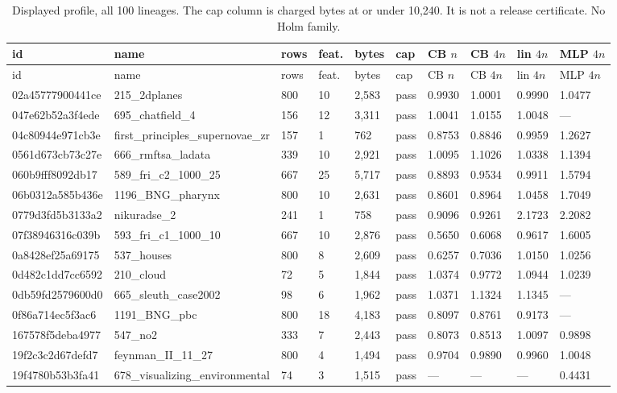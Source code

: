\scriptsize
\begin{longtable}{llllllllll}
\caption{Displayed profile, all 100 lineages. The cap column is charged bytes at or under 10{,}240. It is not a release certificate. No Holm family.}\\
\toprule
id & name & rows & feat. & bytes & cap & CB $n$ & CB $4n$ & lin $4n$ & MLP $4n$\\
\midrule
\endfirsthead
\toprule
id & name & rows & feat. & bytes & cap & CB $n$ & CB $4n$ & lin $4n$ & MLP $4n$\\
\midrule
\endhead
\bottomrule
\endfoot
02a45777900441ce & 215\_2dplanes & 800 & 10 & 2,583 & pass & 0.9930 & 1.0001 & 0.9990 & 1.0477\\
047e62b52a3f4ede & 695\_chatfield\_4 & 156 & 12 & 3,311 & pass & 1.0041 & 1.0155 & 1.0048 & ---\\
04c80944e971cb3e & first\_principles\_supernovae\_zr & 157 & 1 & 762 & pass & 0.8753 & 0.8846 & 0.9959 & 1.2627\\
0561d673cb73c27e & 666\_rmftsa\_ladata & 339 & 10 & 2,921 & pass & 1.0095 & 1.1026 & 1.0338 & 1.1394\\
060b9fff8092db17 & 589\_fri\_c2\_1000\_25 & 667 & 25 & 5,717 & pass & 0.8893 & 0.9534 & 0.9911 & 1.5794\\
06b0312a585b436e & 1196\_BNG\_pharynx & 800 & 10 & 2,631 & pass & 0.8601 & 0.8964 & 1.0458 & 1.7049\\
0779d3fd5b3133a2 & nikuradse\_2 & 241 & 1 & 758 & pass & 0.9096 & 0.9261 & 2.1723 & 2.2082\\
07f38946316c039b & 593\_fri\_c1\_1000\_10 & 667 & 10 & 2,876 & pass & 0.5650 & 0.6068 & 0.9617 & 1.6005\\
0a8428ef25a69175 & 537\_houses & 800 & 8 & 2,609 & pass & 0.6257 & 0.7036 & 1.0150 & 1.0256\\
0d482c1dd7cc6592 & 210\_cloud & 72 & 5 & 1,844 & pass & 1.0374 & 0.9772 & 1.0944 & 1.0239\\
0db59fd2579600d0 & 665\_sleuth\_case2002 & 98 & 6 & 1,962 & pass & 1.0371 & 1.1324 & 1.1345 & ---\\
0f86a714ec5f3ac6 & 1191\_BNG\_pbc & 800 & 18 & 4,183 & pass & 0.8097 & 0.8761 & 0.9173 & ---\\
167578f5deba4977 & 547\_no2 & 333 & 7 & 2,443 & pass & 0.8073 & 0.8513 & 1.0097 & 0.9898\\
19f2c3c2d67defd7 & feynman\_II\_11\_27 & 800 & 4 & 1,494 & pass & 0.9704 & 0.9890 & 0.9960 & 1.0048\\
19f4780b53b3fa41 & 678\_visualizing\_environmental & 74 & 3 & 1,515 & pass & --- & --- & --- & 0.4431\\

\end{longtable}
